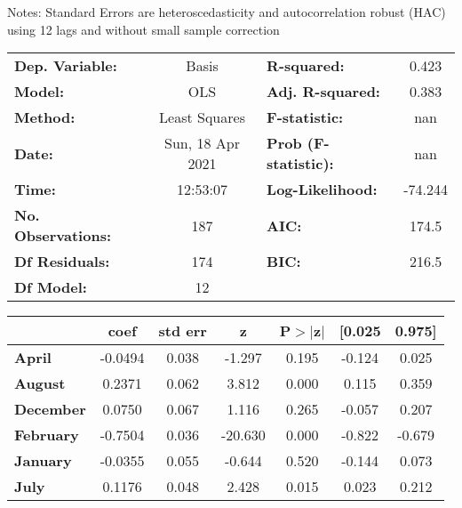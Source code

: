 Notes: \newline
 [1] Standard Errors are heteroscedasticity and autocorrelation robust (HAC) using 12 lags and without small sample correction
\begin{center}
\begin{tabular}{lclc}
\toprule
\textbf{Dep. Variable:}    &      Basis       & \textbf{  R-squared:         } &     0.423   \\
\textbf{Model:}            &       OLS        & \textbf{  Adj. R-squared:    } &     0.383   \\
\textbf{Method:}           &  Least Squares   & \textbf{  F-statistic:       } &       nan   \\
\textbf{Date:}             & Sun, 18 Apr 2021 & \textbf{  Prob (F-statistic):} &      nan    \\
\textbf{Time:}             &     12:53:07     & \textbf{  Log-Likelihood:    } &   -74.244   \\
\textbf{No. Observations:} &         187      & \textbf{  AIC:               } &     174.5   \\
\textbf{Df Residuals:}     &         174      & \textbf{  BIC:               } &     216.5   \\
\textbf{Df Model:}         &          12      & \textbf{                     } &             \\
\bottomrule
\end{tabular}
\begin{tabular}{lcccccc}
                   & \textbf{coef} & \textbf{std err} & \textbf{z} & \textbf{P$> |$z$|$} & \textbf{[0.025} & \textbf{0.975]}  \\
\midrule
\textbf{April}     &      -0.0494  &        0.038     &    -1.297  &         0.195        &       -0.124    &        0.025     \\
\textbf{August}    &       0.2371  &        0.062     &     3.812  &         0.000        &        0.115    &        0.359     \\
\textbf{December}  &       0.0750  &        0.067     &     1.116  &         0.265        &       -0.057    &        0.207     \\
\textbf{February}  &      -0.7504  &        0.036     &   -20.630  &         0.000        &       -0.822    &       -0.679     \\
\textbf{January}   &      -0.0355  &        0.055     &    -0.644  &         0.520        &       -0.144    &        0.073     \\
\textbf{July}      &       0.1176  &        0.048     &     2.428  &         0.015        &        0.023    &        0.212     \\

\end{tabular}
\end{center}
